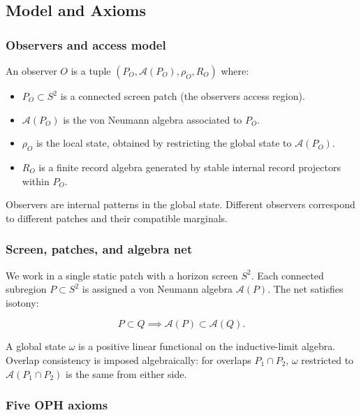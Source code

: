 \subsection{Model and Axioms}\label{1-model-and-axioms}

\subsubsection{Observers and access model}\label{11-observers-and-access-model}

An observer \(O\) is a tuple \((P_O, \mathcal{A}(P_O), \rho_O, R_O)\) where:

\begin{itemize}
\tightlist
\item
  \(P_O \subset S^2\) is a connected screen patch (the observer\textquotesingle s access region).
\item
  \(\mathcal{A}(P_O)\) is the von Neumann algebra associated to \(P_O\).
\item
  \(\rho_O\) is the local state, obtained by restricting the global state to \(\mathcal{A}(P_O)\).
\item
  \(R_O\) is a finite record algebra generated by stable internal record projectors within \(P_O\).
\end{itemize}

Observers are internal patterns in the global state. Different observers correspond to different patches and their compatible marginals.

\subsubsection{Screen, patches, and algebra net}\label{12-screen-patches-and-algebra-net}

We work in a single static patch with a horizon screen \(S^2\). Each connected subregion \(P \subset S^2\) is assigned a von Neumann algebra \(\mathcal{A}(P)\). The net satisfies isotony:

\[
P \subset Q \implies \mathcal{A}(P) \subset \mathcal{A}(Q).
\]

A global state \(\omega\) is a positive linear functional on the inductive-limit algebra. Overlap consistency is imposed algebraically: for overlaps \(P_1 \cap P_2\), \(\omega\) restricted to \(\mathcal{A}(P_1 \cap P_2)\) is the same from either side.

\subsubsection{Five OPH axioms}\label{13-core-axioms}

